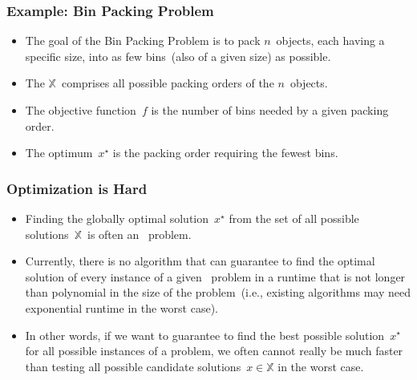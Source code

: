 \documentclass[aspectratio=169,mathserif,notheorems]{beamer}%
\gdef\searchSpace{\ensuremath{\mathbb{X}}}%
\gdef\sespel{\ensuremath{x}}%
\gdef\opti#1{\ensuremath{#1^{\star}}}%
\begin{document}
%
\begin{frame}[t]%
\frametitle{Example: Bin Packing Problem}%
\begin{itemize}%
\item The goal of the Bin Packing Problem is to pack $n$~objects, each having a specific size, into as few bins~(also of a given size) as possible\cite{ZLWvdBTW2024RLSOT2RBPPWIR,ZWvdBTLTW2024RLSFTDBPAANRFFFA}.%
\item<2-> The \searchSpace\ comprises all possible packing orders of the $n$~objects.%
\item<3-> The objective function~$f$ is the number of bins needed by a given packing order.%
\item<4-> The optimum~$\opti{\sespel}$ is the packing order requiring the fewest bins.%
\end{itemize}%
%
\end{frame}%
%
\begin{frame}[t]%
\frametitle{Optimization is Hard}%
\begin{itemize}%
%
\item Finding the globally optimal solution~\opti{\sespel} from the set of all possible solutions~\searchSpace\ is often an \npHard\ problem.%
%
\item<2-> Currently, there is no algorithm that can \alert{guarantee} to find the optimal solution of \alert{every instance} of a given \npHard\ problem in a runtime that is not longer than polynomial in the size of the problem~(i.e., existing algorithms may need exponential runtime in the \alert{worst case}).%
%
\item<4-> In other words, if we want to guarantee to find the best possible solution~\opti{\sespel} for all possible instances of a problem, we often cannot really be much faster than testing all possible candidate solutions~$\sespel\in\searchSpace$ in the \alert{worst case}.%
%
\end{itemize}%
%
%
%
\end{frame}%
%
\end{document}
